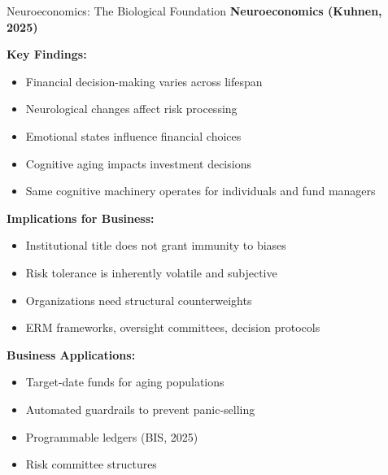 \documentclass[aspectratio=169,10pt]{beamer}
\renewcommand{\small}{\fontsize{7pt}{8.5pt}\selectfont}
\renewcommand{\large}{\fontsize{9pt}{11pt}\selectfont}
\newcommand{\question}[1]{{\large\bfseries\color{crimson}#1}}
\begin{document}
	\begin{frame}{Neuroeconomics: The Biological Foundation}
		\question{Neuroeconomics (Kuhnen, 2025)}
		\small
		
		\textbf{Key Findings:}
		\begin{itemize}
			\item Financial decision-making varies across lifespan
			\item Neurological changes affect risk processing
			\item Emotional states influence financial choices
			\item Cognitive aging impacts investment decisions
			\item Same cognitive machinery operates for individuals and fund managers
		\end{itemize}
		
		\vspace{0.1cm}
		\textbf{Implications for Business:}
		\begin{itemize}
			\item Institutional title does not grant immunity to biases
			\item Risk tolerance is inherently volatile and subjective
			\item Organizations need structural counterweights
			\item ERM frameworks, oversight committees, decision protocols
		\end{itemize}
		
		\vspace{0.1cm}
		\textbf{Business Applications:}
		\begin{itemize}
			\item Target-date funds for aging populations
			\item Automated guardrails to prevent panic-selling
			\item Programmable ledgers (BIS, 2025)
			\item Risk committee structures
		\end{itemize}
	\end{frame}
	
	
\end{document}
